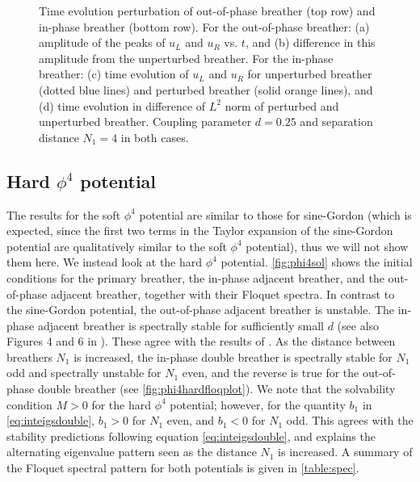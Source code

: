 \documentclass[12pt,reqno]{amsart}
\theoremstyle{definition}
\begin{document}
\begin{figure}
\begin{center}
\begin{subfigure}{0.45\linewidth}
		\label{fig:timestepSGd}
	\end{subfigure}
	\end{center}
	\caption{Time evolution perturbation of out-of-phase breather (top row) and in-phase breather (bottom row). For the out-of-phase breather: (a) amplitude of the peaks of $u_L$ and $u_R$ vs. $t$, and (b) difference in this amplitude from the unperturbed breather. For the in-phase breather: (c) time evolution of $u_L$ and $u_R$ for unperturbed breather (dotted blue lines) and perturbed breather (solid orange lines), and (d) time evolution in difference of $L^2$ norm of perturbed and unperturbed breather. Coupling parameter $d=0.25$ and separation distance $N_1 = 4$ in both cases.}
	\label{fig:timestepSG}
\end{figure}

\subsection{Hard \texorpdfstring{$\phi^4$}{phi-4} potential}

The results for the soft $\phi^4$ potential are similar to those for sine-Gordon (which is expected, since the first two terms in the Taylor expansion of the sine-Gordon potential are qualitatively similar to the soft $\phi^4$ potential), thus we will not show them here. We instead look at the hard $\phi^4$ potential. \cref{fig:phi4sol} shows the initial conditions for the primary breather, the in-phase adjacent breather, and the out-of-phase adjacent breather, together with their Floquet spectra. In contrast to the sine-Gordon potential, the out-of-phase adjacent breather is unstable. The in-phase adjacent breather is spectrally stable for sufficiently small $d$ (see also Figures 4 and 6 in \cite{cuevas-maraver2016}). These agree with the results of \cites{Archilla2003,Koukouloyannis2009}. As the distance between breathers $N_1$ is increased, the in-phase double breather is spectrally stable for $N_1$ odd and spectrally unstable for $N_1$ even, and the reverse is true for the out-of-phase double breather (see \cref{fig:phi4hardfloqplot}). We note that the solvability condition $M > 0$ for the hard $\phi^4$ potential; however, for the quantity $b_1$ in \cref{eq:inteigsdouble}, $b_1 > 0$ for $N_1$ even, and $b_1 < 0$ for $N_1$ odd. This agrees with the stability predictions following equation \cref{eq:inteigsdouble}, and explains the alternating eigenvalue pattern seen as the distance $N_1$ is increased. A summary of the Floquet spectral pattern for both potentials is given in \cref{table:spec}.
\end{document}
